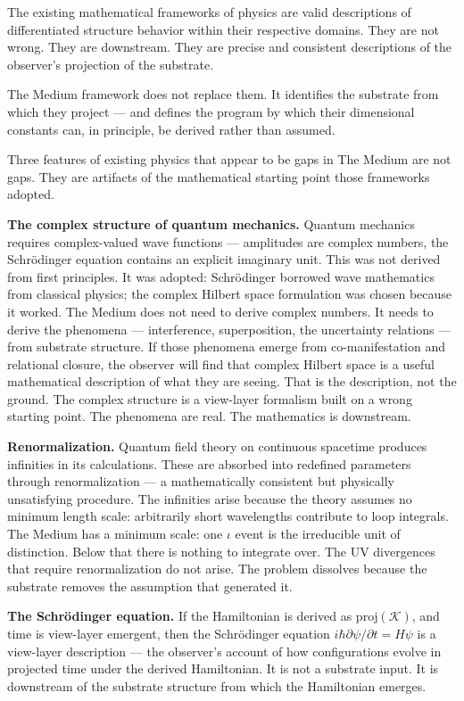 \documentclass[11pt,letterpaper]{article}
\newcommand{\Kappa}{\mathcal{K}}
\begin{document}
The existing mathematical frameworks of physics are valid descriptions of differentiated structure behavior within their respective domains. They are not wrong. They are downstream. They are precise and consistent descriptions of the observer's projection of the substrate.

The Medium framework does not replace them. It identifies the substrate from which they project --- and defines the program by which their dimensional constants can, in principle, be derived rather than assumed.

Three features of existing physics that appear to be gaps in The Medium are not gaps. They are artifacts of the mathematical starting point those frameworks adopted.

\textbf{The complex structure of quantum mechanics.} Quantum mechanics requires complex-valued wave functions --- amplitudes are complex numbers, the Schrödinger equation contains an explicit imaginary unit. This was not derived from first principles. It was adopted: Schrödinger borrowed wave mathematics from classical physics; the complex Hilbert space formulation was chosen because it worked. The Medium does not need to derive complex numbers. It needs to derive the phenomena --- interference, superposition, the uncertainty relations --- from substrate structure. If those phenomena emerge from co-manifestation and relational closure, the observer will find that complex Hilbert space is a useful mathematical description of what they are seeing. That is the description, not the ground. The complex structure is a view-layer formalism built on a wrong starting point. The phenomena are real. The mathematics is downstream.

\textbf{Renormalization.} Quantum field theory on continuous spacetime produces infinities in its calculations. These are absorbed into redefined parameters through renormalization --- a mathematically consistent but physically unsatisfying procedure. The infinities arise because the theory assumes no minimum length scale: arbitrarily short wavelengths contribute to loop integrals. The Medium has a minimum scale: one \(\iota\) event is the irreducible unit of distinction. Below that there is nothing to integrate over. The UV divergences that require renormalization do not arise. The problem dissolves because the substrate removes the assumption that generated it.

\textbf{The Schrödinger equation.} If the Hamiltonian is derived as \(\mathrm{proj}(\Kappa)\), and time is view-layer emergent, then the Schrödinger equation \(i\hbar \partial\psi/\partial t = \hat{H}\psi\) is a view-layer description --- the observer's account of how configurations evolve in projected time under the derived Hamiltonian. It is not a substrate input. It is downstream of the substrate structure from which the Hamiltonian emerges.
\end{document}
